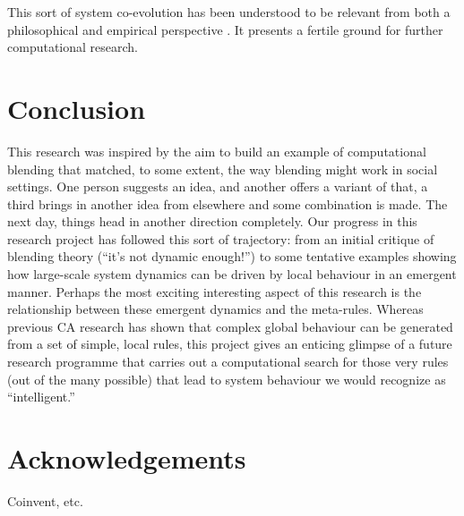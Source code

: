 \documentclass{AISB2008}
\begin{document}
This sort of system co-evolution has been understood to be relevant
from both a philosophical \cite{mead1932philosophy} and empirical
perspective \cite{van1973new}.  It presents a fertile ground for
further computational research.

\section{Conclusion}

This research was inspired by the aim to build an example of
computational blending that matched, to some extent, the way blending
might work in social settings.  One person suggests an idea, and
another offers a variant of that, a third brings in another idea from
elsewhere and some combination is made.  The next day, things head in
another direction completely.  Our progress in this research project
has followed this sort of trajectory: from an initial critique of
blending theory (``it's not dynamic enough!'') to some tentative
examples showing how large-scale system dynamics can be driven by
local behaviour in an emergent manner.  Perhaps the most exciting
interesting aspect of this research is the relationship between these
emergent dynamics and the meta-rules.  Whereas previous CA research
has shown that complex global behaviour can be generated from a set of
simple, local rules, this project gives an enticing glimpse of a
future research programme that carries out a computational search for
those very rules (out of the many possible) that lead to system
behaviour we would recognize as ``intelligent.''

\section{Acknowledgements}

Coinvent, etc.


\end{document}
